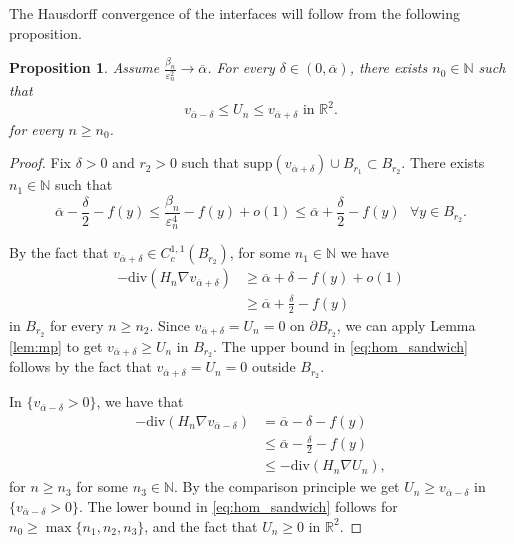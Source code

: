 \documentclass[10pt,a4paper]{article}
\newcommand{\NN}{\mathbb{N}}
\newcommand{\RR}{\mathbb{R}}
\newcommand{\divg}{\mathrm{div}}
\newcommand{\supp}{\mathrm{supp}}
\newcommand{\faskip}{\hspace{8pt}}
\newtheorem{prop}[thm]{Proposition}
\numberwithin{equation}{section}
\begin{document}
The Hausdorff convergence of the interfaces will follow from the following proposition.
\begin{prop}
	\label{prop:hom_sandwich}
	Assume $ \frac{\beta_n}{\varepsilon_n^{2}} \rightarrow \overline{\alpha} $. For every $\delta \in (0, \overline{\alpha})$, there exists $ n_0 \in \NN $ such that 
	\begin{equation}
	\label{eq:hom_sandwich}
		v_{\overline{\alpha} - \delta} \leq U_n \leq v_{\overline{\alpha} + \delta} \text{ in } \RR^{2}.
	\end{equation}
	for every $n\geq n_0$.
\end{prop}
\begin{proof}
	Fix $\delta > 0$ and $ r_2 > 0 $ such that $\supp (v_{\overline{\alpha} + \delta}) \cup B_{r_1} \subset  B_{r_2} $. There exists $n_1 \in \NN$ such that 
	\begin{equation}
	\label{eq:hom_rhs}
	\overline{\alpha} - \frac{\delta}{2} - f(y) \leq \frac{\beta_n}{\varepsilon_n^{4}} - f(y) + o(1) \leq \overline{\alpha} + \frac{\delta}{2} - f(y) \faskip \forall y \in B_{r_2}.
	\end{equation}
	
	By the fact that $v_{\overline{\alpha} + \delta} \in C^{1,1}_c(B_{r_2}) $, for some $ n_1 \in \NN $ we have
	\begin{align*}
		-\divg(H_n \nabla v_{\overline{\alpha} + \delta}) &\geq \overline{\alpha} + \delta - f(y) + o(1) \\
							  &\geq \overline{\alpha} + \frac{\delta}{2} - f(y)
	\end{align*}
	in $ B_{r_2} $ for every $ n\geq n_2 $. Since $ v_{\overline{\alpha} + \delta} = U_n = 0 $ on $ \partial B_{r_2} $, we can apply Lemma \ref{lem:mp} to get $ v_{\overline{\alpha} + \delta} \geq U_n $ in $ B_{r_2} $. The upper bound in \eqref{eq:hom_sandwich} follows by the fact that $ v_{\overline{\alpha} + \delta} = U_n = 0$ outside $ B_{r_2} $.

	In $ \{v_{\overline{\alpha} - \delta} > 0\} $, we have that 
	\begin{align*}
		-\divg(H_n \nabla v_{\overline{\alpha} - \delta}) &= \overline{\alpha} - \delta -f(y) \\
								  &\leq \overline{\alpha} - \frac{\delta}{2} - f(y) \\
								  &\leq -\divg(H_n\nabla U_n),
	\end{align*}
	for $ n \geq n_3 $ for some $ n_3 \in \NN $. By the comparison principle we get $ U_n \geq v_{\overline{\alpha} - \delta} $ in $ \{v_{\overline{\alpha} - \delta} > 0\}$. The lower bound in \eqref{eq:hom_sandwich} follows for $ n_0\geq \max\{ n_1, n_2, n_3\} $, and the fact that $ U_n \geq 0 $ in $ \RR^{2} $. 
\end{proof}
\end{document}
